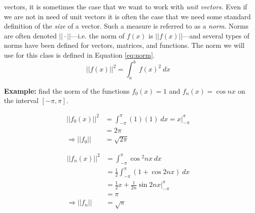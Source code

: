  vectors, it is sometimes the case that we want to work with \emph{unit vectors.} Even if we are not in need of unit vectors it is often the case that we need some standard definition of the \emph{size} of a vector. Such a measure is referred to as a \emph{norm}.  Norms are often denoted $||\cdot||$---i.e. the norm of $f(x)$ is $||f(x)||$---and several types of norms have been defined for vectors, matrices, and functions.  The norm we will use for this class is defined in Equation \ref{eq:norm}.
\begin{equation}
||f(x)||^2 = \int_{a}^{b} \ f(x)^2 \ dx
\label{eq:norm}
\end{equation}  

\vspace{0.5cm}

\noindent\textbf{Example:} find the norm of the functions $f_0(x)=1$ and $f_n(x)=\cos{nx}$ on the interval $[-\pi,\pi]$.

\vspace{0.25cm}

\begin{align*}
||f_0(x)||^2 &= \int_{-\pi}^{\pi} (1)(1) \ dx = x\Bigr|_{-\pi}^{\pi} \\
&=2\pi \\
\Rightarrow ||f_0|| &= \sqrt{2\pi}
\end{align*}

\vspace{0.25cm}
\begin{align*}
||f_n(x)||^2 &= \int_{-\pi}^{\pi} \cos{^2nx} \ dx \\
&= \frac{1}{2}\int_{-\pi}^{\pi}\left(1+\cos{2nx}\right) \ dx \\
&= \frac{1}{2}x + \frac{1}{2n}\sin{2nx}\Bigr|_{-\pi}^{\pi} \\
&= \pi \\
\Rightarrow ||f_n|| &= \sqrt{\pi}
\end{align*}

